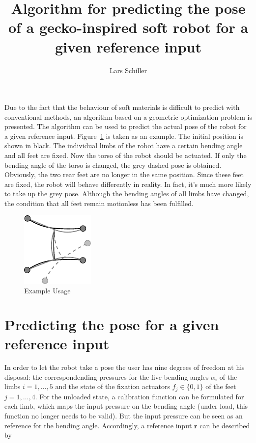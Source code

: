 \documentclass[10pt,a4paper]{article}
\author{Lars Schiller}
\title{Algorithm for predicting the pose of a gecko-inspired soft robot for a given reference input}
\begin{document}
\maketitle



Due to the fact that the behaviour of soft materials is difficult to predict with conventional methods, an algorithm based on a geometric optimization problem is presented.
The algorithm can be used to predict the actual pose of the robot for a given reference input.
Figure~\ref{fig:example} is taken as an example. The initial position is shown in black. 
The individual limbs of the robot have a certain bending angle and all feet are fixed.
Now the torso of the robot should be actuated. 
If only the bending angle of the torso is changed, the grey dashed pose is obtained. 
Obviously, the two rear feet are no longer in the same position. 
Since these feet are fixed, the robot will behave differently in reality. 
In fact, it's much more likely to take up the grey pose. 
Although the bending angles of all limbs have changed, the condition that all feet remain motionless has been fulfilled.

\begin{figure}[h]
\centering\includegraphics[scale=1]{../Pics/intro/intro.pdf}
\caption{Example Usage}
\label{fig:example}
\end{figure}



\section{Predicting the pose for a given reference input}
In order to let the robot take a pose
the user has nine degrees of freedom at his disposal: 
the correspondending pressures for the five bending angles $\alpha_i$ of the limbs $i=1,\dots,5$ and the state of the fixation actuators $f_j \in \{0,1\}$ of the feet $j=1,\dots,4$.
For the unloaded state, a calibration function can be formulated for each limb, which maps the input pressure on the bending angle (under load, this function no longer needs to be valid).
But the input pressure can be seen as an reference for the bending angle.
Accordingly, a reference input $\bm{r}$ can be described by
\end{document}
